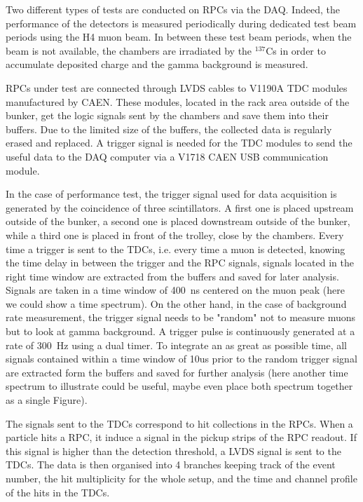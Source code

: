 		Two different types of tests are conducted on RPCs via the DAQ. Indeed, the performance of the detectors is measured periodically during dedicated test beam periods using the H4 muon beam. In between these test beam periods, when the beam is not available, the chambers are irradiated by the $^{137}$Cs in order to accumulate deposited charge and the gamma background is measured.

		RPCs under test are connected through LVDS cables to V1190A \acf{TDC} modules manufactured by CAEN. These modules, located in the rack area outside of the bunker, get the logic signals sent by the chambers and save them into their buffers. Due to the limited size of the buffers, the collected data is regularly erased and replaced. A trigger signal is needed for the TDC modules to send the useful data to the DAQ computer via a V1718 CAEN USB communication module.

		In the case of performance test, the trigger signal used for data acquisition is generated by the coincidence of three scintillators. A first one is placed upstream outside of the bunker, a second one is placed downstream outside of the bunker, while a third one is placed in front of the trolley, close by the chambers. Every time a trigger is sent to the TDCs, i.e. every time a muon is detected, knowing the time delay in between the trigger and the RPC signals, signals located in the right time window are extracted from the buffers and saved for later analysis. Signals are taken in a time window of \SI{400}{ns} centered on the muon peak (here we could show a time spectrum). On the other hand, in the case of background rate measurement, the trigger signal needs to be "random" not to measure muons but to look at gamma background. A trigger pulse is continuously generated at a rate of \SI{300}{Hz} using a dual timer. To integrate an as great as possible time, all signals contained within a time window of 10us prior to the random trigger signal are extracted form the buffers and saved for further analysis (here another time spectrum to illustrate could be useful, maybe even place both spectrum together as a single Figure).

		The signals sent to the TDCs correspond to hit collections in the RPCs. When a particle hits a RPC, it induce a signal in the pickup strips of the RPC readout. If this signal is higher than the detection threshold, a LVDS signal is sent to the TDCs. The data is then organised into 4 branches keeping track of the event number, the hit multiplicity for the whole setup, and the time and channel profile of the hits in the TDCs.

